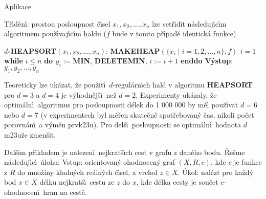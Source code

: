 \documentclass[a4paper,12pt]{article}
\begin{document}
\head
Aplikace 
\endhead

\flushpar T\v r\'\i d\v en\'\i : prostou posloupnost 
\v c\'\i sel $x_1,x_2,\dots,x_n$ lze set\v r\'\i dit n\'asleduj\'\i c\'\i m 
algoritmem pou\v z\'\i\-vaj\'\i c\'\i m haldu ($f$ bude v tomto p\v r\'\i pad\v e 
identick\'a funkce).
\bigskip

$d${\bf -HEAPSORT$(x_1,x_2,\dots,x_n)$}:\newline 
{\bf MAKEHEAP$(\{x_i\mid i=1,2,\dots,n\},f)$\newline 
$i=1$\newline 
while} $i\le n$ {\bf do\newline 
\phantom{{\rm ---}}$y_i:=$MIN}, {\bf DELETEMIN}, $i:=i+1$\newline 
{\bf enddo\newline 
V\'ystup}: $y_1,y_2,\dots,y_n$
\bigskip


\flushpar Teoreticky lze uk\'azat, \v ze pou\v zit\'\i\ $d$-regul\'arn\'\i ch hald v 
algoritmu {\bf HEAPSORT} pro $d=3$ a $d=4$ je v\'yhodn\v ej\v s\'\i\ 
ne\v z $d=2$. Experimenty uk\'azaly, \v ze optim\'aln\'\i\ 
algoritmus pro posloupnosti d\'elek do 1 000 000 by m\v el  
pou\v z\'\i vat $d=6$ nebo $d=7$ (v experimentech byl m\v e\v ren 
skute\v cn\v e spot\v rebovan\'y \v cas, nikoli po\v cet porovn\'an\'\i\ a 
v\'ym\v en prvk\accent23u). 
Pro del\v s\'\i\ posloupnosti se optim\'aln\'\i\ 
hodnota $d$ m\accent23u\v ze zmen\v sit.
\bigskip

\flushpar Dal\v s\'\i m p\v r\'\i kladem je nalezen\'\i\ nejkrat\v s\'\i ch cest v grafu z dan\'eho 
bodu. \v Re\v sme n\'asleduj\'\i c\'\i\ \'ulohu: \newline 
Vstup: orientovan\'y ohodnocen\'y graf $(X,R,c)$, kde $c$ je funkce z $
R$ do mno\v ziny kladn\'ych 
re\'aln\'ych \v c\'\i sel, a vrchol $z\in X$.\newline 
\'Ukol: nal\'ezt pro ka\v zd\'y bod $x\in X$ d\'elku 
nejkrat\v s\'\i\ cestu ze $z$ do $x$, kde d\'elka cesty je sou\v cet 
$c$-ohodnocen\'\i\ hran na cest\v e.
\bigskip
\end{document}
